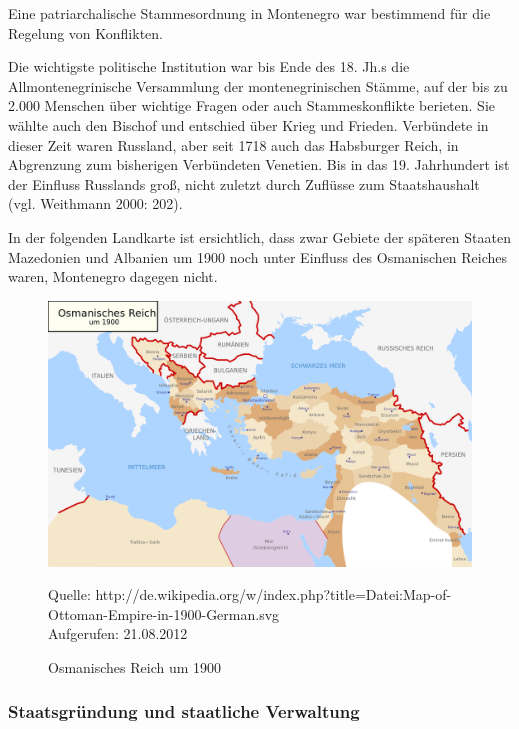 Eine patriarchalische Stammesordnung in Montenegro war bestimmend für die Regelung von Konflikten.\par
Die wichtigste politische Institution war bis Ende des 18. Jh.s die Allmontenegrinische Versammlung der montenegrinischen Stämme, auf der bis zu 2.000 Menschen über wichtige Fragen oder auch Stammeskonflikte berieten. Sie wählte auch den Bischof und entschied über Krieg und Frieden. Verbündete in dieser Zeit waren Russland, aber seit 1718 auch das Habsburger Reich, in Abgrenzung zum bisherigen Verbündeten Venetien. Bis in das 19. Jahrhundert ist der Einfluss Russlands groß, nicht zuletzt durch Zuflüsse zum Staatshaushalt (vgl. Weithmann 2000: 202).\par
In der folgenden Landkarte ist ersichtlich, dass zwar Gebiete der späteren Staaten Mazedonien und Albanien um 1900 noch unter Einfluss des Osmanischen Reiches waren, Montenegro dagegen nicht. 
\begin{figure}[H]
  \centering
  \includegraphics[width=5in]{Material/Map-of-Ottoman-Empire-in-1900}
  \caption{Osmanisches Reich um 1900}
  \scriptsize{Quelle: http://de.wikipedia.org/w/index.php?title=Datei:Map-of-Ottoman-Empire-in-1900-German.svg\\Aufgerufen: 21.08.2012}
\end{figure}

\subsubsection{Staatsgründung und staatliche Verwaltung }

